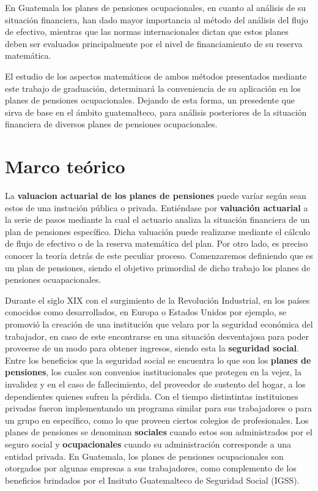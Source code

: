 \documentclass[12pt,letterpaper,titlepage]{article}
\begin{document}
En Guatemala los planes de pensiones ocupacionales, en cuanto al análisis de su situación financiera, han dado mayor importancia al método del análisis del flujo de efectivo, mientras que las normas internacionales dictan que estos planes deben ser evaluados principalmente por el nivel de financiamiento de su reserva matemática.  \bigskip

El estudio de los aspectos matemáticos de ambos métodos presentados mediante este trabajo de graduación, determinará la conveniencia de su aplicación en los planes de pensiones ocupacionales. Dejando de esta forma, un presedente que sirva de base en el ámbito guatemalteco, para análisis posteriores de la situación financiera de diversos planes de pensiones ocupacionales.



\newpage

\section{Marco teórico}

La \textbf{valuacion actuarial de los planes de pensiones} puede varíar según sean estos de una instución pública o privada. Entiéndase por \textbf{valuación actuarial} a la serie de pasos mediante la cual el actuario analiza la situación financiera de un plan de pensiones específico. Dicha valuación puede realizarse mediante el cálculo de flujo de efectivo o de la reserva matemática del plan. Por otro lado, es preciso conocer la teoría detrás de este peculiar proceso. Comenzaremos definiendo que es un plan de pensiones, siendo el objetivo primordial de dicho trabajo los planes de pensiones ocuapacionales. 

Durante el siglo XIX con el surgimiento de la Revolución Industrial, en los países conocidos como desarrollados, en Europa o Estados Unidos por ejemplo,  se promovió la creación de una institución que velara por la seguridad económica del trabajador, en caso de este encontrarse en una situación desventajosa para poder proveerse de un modo para obtener ingresos, siendo esta la \textbf{seguridad social}. Entre los beneficios que la seguridad social se encuentra lo que son los \textbf{planes de pensiones}, los cuales son convenios institucionales que protegen en la vejez, la invalidez y en el caso de fallecimiento, del proveedor de sustento del hogar, a los dependientes quienes sufren la pérdida. Con el tiempo distintintas instituiones privadas fueron implementando un programa similar para sus trabajadores o para un grupo en específico, como lo que proveen ciertos colegios de profesionales. Los planes de pensiones se denominan \textbf{sociales} cuando estos son administrados por el seguro social y \textbf{ocupacionales} cuando su administración corresponde a una entidad privada.  En Guatemala, los planes de pensiones ocupacionales son otorgados por algunas empresas a sus trabajadores, como complemento de los beneficios brindados por el Insituto Guatemalteco de Seguridad Social (IGSS). 
\end{document}
